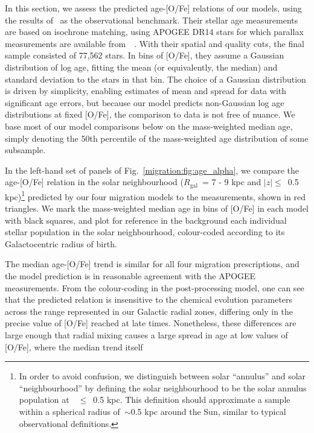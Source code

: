 In this section, we assess the predicted age-[O/Fe] relations of our models, 
using the results of~\citet{Feuillet2019} as the observational benchmark. 
Their stellar age measurements are based on isochrone matching, 
using APOGEE DR14 stars for which parallax measurements are available 
from~\gaia~\citep{Abolfathi2018, GaiaCollaboration2018}.
With their spatial and quality cuts, the final sample consisted of 77,562 
stars. 
In bins of [O/Fe], they assume a Gaussian distribution of log age, fitting the 
mean (or equivalently, the median) and standard deviation to the stars in that 
bin. 
The choice of a Gaussian distribution is driven by simplicity, enabling 
estimates of mean and spread for data with significant age errors, but because 
our model predicts non-Gaussian log age distributions at fixed [O/Fe], the 
comparison to data is not free of nuance. 
We base most of our model comparisons below on the mass-weighted median age, 
simply denoting the 50th percentile of the mass-weighted age distribution of 
some subsample. 
\par 
In the left-hand set of panels of Fig.~\ref{migration:fig:age_alpha}, we compare the 
age-[O/Fe] relation in the solar neighbourhood ($R_\text{gal}$~= 7 - 9 kpc and 
$\left|z\right|\leq$~0.5 kpc)\footnote{
	In order to avoid confusion, we distinguish between solar ``annulus'' and 
	solar ``neighbourhood'' by defining the solar neighbourhood to be the 
	solar annulus population at~\absz~$\leq$~0.5 kpc. This definition should 
	approximate a sample within a spherical radius of~$\sim$0.5 kpc around the 
	Sun, similar to typical observational definitions. 
} predicted by our four migration models to the 
\citet{Feuillet2019} measurements, shown in red triangles. 
We mark the mass-weighted median age in bins of [O/Fe] in each model with black 
squares, and plot for reference in the background each individual stellar 
population in the solar neighbourhood, colour-coded according to its 
Galactocentric radius of birth. 
\par 
The median age-[O/Fe] trend is similar for all four migration prescriptions, 
and the model prediction is in reasonable agreement with the APOGEE 
measurements. 
From the colour-coding in the post-processing model, one can see that the 
predicted relation is insensitive to the chemical evolution parameters across 
the range represented in our Galactic radial zones, differing only in the 
precise value of [O/Fe] reached at late times. 
Nonetheless, these differences are large enough that radial mixing causes a 
large spread in age at low values of [O/Fe], where the median trend itself 
